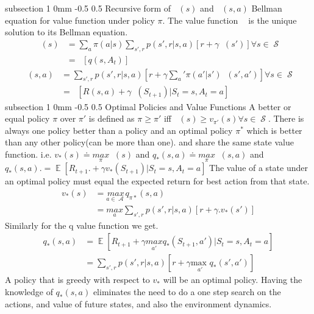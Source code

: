 \documentclass[twocolumn,11pt]{article}
\makeatletter
\DeclareMathOperator{\E}{\mathbb{E}}
\DeclareMathOperator{\state}{\mathcal{S}}
\DeclareMathOperator{\action}{\mathcal{A}}
\DeclareMathOperator{\qp}{q_\pi} %
\DeclareMathOperator{\vp}{v_\pi} %
\DeclareMathOperator{\Ep}{\E_\pi}
\renewcommand{\subsection}{\@startsection
{subsection}%
{1}%
{0mm}%
{-0.5\baselineskip}%
{0.5\baselineskip}%
{\bfseries\color{blue}}} %
\makeatother
\begin{document}
\subsection{Recursive form of $\vp(s)$ and $\qp(s,a)$}
Bellman equation for value function under policy $\pi$. \useshortskip
The value function $\vp$ is the unique solution to its Bellman equation. 
\begin{align}
	\vp(s)  &=\sum_a \pi(a|s) \sum_{s',r} p(s',r|s,a) [r + \gamma \vp(s')] \forall s \in \state\\
	&= \Ep[q(s, A_t)]
\end{align}
\begin{align}
	\qp(s,a)  &=  \sum_{s',r} p(s',r|s,a) [r + \gamma \sum_a' \pi(a'|s') \qp(s',a')] \forall s \in \state\\
	&= \Ep[ R(s,a) + \gamma \vp(S_{t+1}) | S_t = s, A_t = a]
\end{align}
\subsection{Optimal Policies and Value Functions}
A better or equal policy $\pi$ over $\pi'$ is defined as $\pi \geq \pi'$ iff $\vp(s) \geq v_{\pi'}(s) \forall s \in \state$. There is always one policy better than a policy and an optimal policy $\pi^*$ which is better than any other policy(can be more than one). and share the same state value function. i.e. $v_*(s) \doteq \underset{\pi}{max}\vp(s)$ and $q_*(s,a) \doteq \underset{\pi}{max} \qp (s,a)$ and $q_*(s,a).  = \E[R_{t+1}. + \gamma v_*(S_{t+1})  | S_t = s, A_t = a]$
The value of a state under an optimal policy must equal the expected return for best action from that state.\useshortskip
\begin{align}\label{eq:v_optimal}
	v_*(s) &= \underset{a \in \action}{max } q_{\pi*}(s,a) \nonumber\\
	&= \underset{a}{max} \sum_{s',r} p(s',r|s,a) [r + \gamma. v_*(s')]
\end{align}
Similarly for the q value function we get.\useshortskip
\begin{align}\label{eq:q_optimal}
	q_*(s,a) &= \E[R_{t+1} + \gamma \underset{a'}{max }q_*(S_{t+1}, a')  | S_t = s, A_t = a]\nonumber\\
	&= \sum_{s',r} p(s',r|s,a) [ r+ \gamma \underset{a'}{\text{max }} q_*(s',a')]
\end{align}
A policy that is greedy with respect to $v_*$ will be an optimal policy. Having the knowledge of $q_*(s,a)$ eliminates the need to do a one step search on the actions, and value of future states, and also the environment dynamics.
\end{document}
